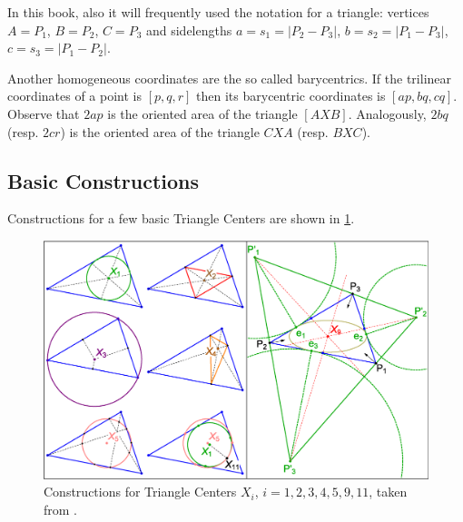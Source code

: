 \begin{remark}
In this book, also it will  frequently used the notation for a triangle: vertices $A=P_1$, $B=P_2$, $C=P_3$ and sidelengths $a=s_1=|P_2-P_3|$, $b=s_2=|P_1-P_3|$,
$c=s_3=|P_1-P_2|$.
\end{remark}

\begin{remark} \label{rem:baricentro_coord}
Another homogeneous coordinates are the so called {barycentrics}. If the   trilinear coordinates of a point is $[p,q,r]$  then its barycentric coordinates is $[ap,bq,cq]$. Observe that $2ap$ is the oriented area of the triangle $[AXB]$. Analogously, $2bq$ (resp. $2cr$) is the oriented area of the triangle $CXA$ (resp. $BXC$).
\end{remark}

\subsection*{Basic Constructions}

Constructions for a few basic Triangle Centers are shown in \cref{fig:constructions}.

\begin{figure}[H]
    \centering
   \includegraphics[width=\textwidth]{zappA/pics/pics_appA_010_constr.eps}
    \caption{Constructions for Triangle Centers $X_i$, $i=1,2,3,4,5,9,11$, taken from \cite{reznik2020-intelligencer}.}
    \label{fig:constructions}
\end{figure}


